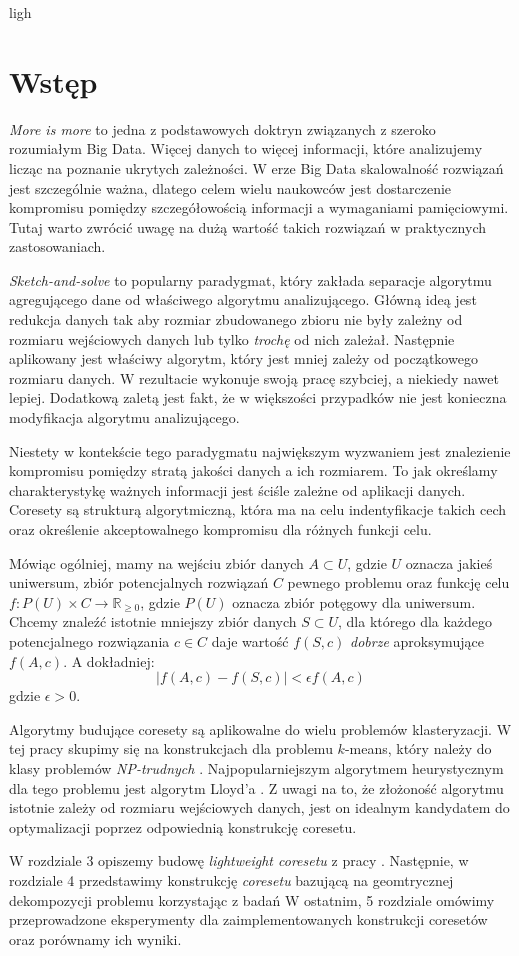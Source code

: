 ligh\chapter{Wstęp}
\textit{More is more} to jedna z podstawowych doktryn związanych z szeroko rozumiałym Big Data.
Więcej danych to więcej informacji, które analizujemy licząc na poznanie ukrytych zależności.
W erze Big Data skalowalność rozwiązań jest szczególnie ważna, dlatego celem wielu naukowców jest dostarczenie kompromisu pomiędzy szczegółowością informacji a wymaganiami pamięciowymi.
Tutaj warto zwrócić uwagę na dużą wartość takich rozwiązań w praktycznych zastosowaniach.

\textit{Sketch-and-solve} to popularny paradygmat, który zakłada separacje algorytmu agregującego dane od właściwego algorytmu analizującego.
Główną ideą jest redukcja danych tak aby rozmiar zbudowanego zbioru nie były zależny od rozmiaru wejściowych danych lub tylko \textit{trochę} od nich zależał.
Następnie aplikowany jest właściwy algorytm, który jest mniej zależy od początkowego rozmiaru danych.
W rezultacie wykonuje swoją pracę szybciej, a niekiedy nawet lepiej.
Dodatkową zaletą jest fakt, że w większości przypadków nie jest konieczna modyfikacja algorytmu analizującego.

Niestety w kontekście tego paradygmatu największym wyzwaniem jest znalezienie kompromisu pomiędzy stratą jakości danych a ich rozmiarem.
To jak określamy charakterystykę ważnych informacji jest ściśle zależne od aplikacji danych.
Coresety są strukturą algorytmiczną, która ma na celu indentyfikacje takich cech oraz określenie akceptowalnego kompromisu dla różnych funkcji celu.

Mówiąc ogólniej, mamy na wejściu zbiór danych $A \subset U$, gdzie $U$ oznacza jakieś uniwersum, zbiór potencjalnych rozwiązań $C$ pewnego problemu oraz funkcję celu $f:P(U) \times C \rightarrow \mathbb{R}_{\geq0}$, gdzie $P(U)$ oznacza zbiór potęgowy dla uniwersum.
Chcemy znaleźć istotnie mniejszy zbiór danych $S \subset U$, dla którego dla każdego potencjalnego rozwiązania $c \in C$ daje wartość $f(S, c)$ \textit{dobrze} aproksymujące $f(A,c)$.
A dokładniej:
\begin{equation}
    |f(A,c) - f(S,c)| < \epsilon f(A,c)
\end{equation}
\noindent
gdzie $\epsilon > 0$.

Algorytmy budujące coresety są aplikowalne do wielu problemów klasteryzacji.
W tej pracy skupimy się na konstrukcjach dla problemu $k$-means, który należy do klasy problemów \textit{NP-trudnych} \cite{article}.
Najpopularniejszym algorytmem heurystycznym dla tego problemu jest algorytm Lloyd'a \cite{1056489}.
Z uwagi na to, że złożoność algorytmu istotnie zależy od rozmiaru wejściowych danych, jest on idealnym kandydatem do optymalizacji poprzez odpowiednią konstrukcję coresetu.

W rozdziale 3 opiszemy budowę \textit{lightweight coresetu} z pracy \cite{bachem2017scalable}.
Następnie, w rozdziale 4 przedstawimy konstrukcję \textit{coresetu} bazującą na geomtrycznej dekompozycji problemu korzystając z badań \cite{DBLP:journals/ki/MunteanuS18}
W ostatnim, 5 rozdziale omówimy przeprowadzone eksperymenty dla zaimplementowanych konstrukcji coresetów oraz porównamy ich wyniki. 